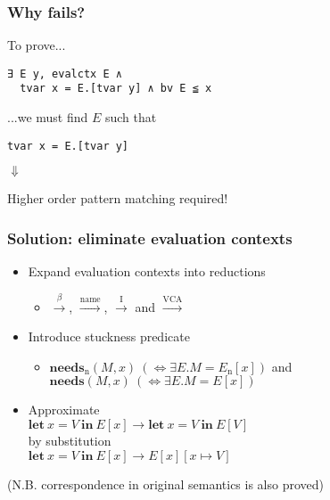 \documentclass[dvipdfmx,cjk,xcolor=dvipsnames,envcountsect,notheorems,12pt]{beamer}
\theoremstyle{definition}
\newcommand{\LET}[3]{\mathbf{let}~#1=#2~\mathbf{in}~#3}
\newcommand{\FULLBETA}{\xrightarrow{\beta}}
\newcommand{\CALLBYNEEDI}{\xrightarrow{\mathrm{I}}}
\newcommand{\CALLBYNEEDVCA}{\xrightarrow{\mathrm{VCA}}}
\newcommand{\CALLBYNAME}{\xrightarrow{\mathrm{name}}}
\newcommand{\DEMAND}[2]{\mathbf{needs}(#2, #1)}
\newcommand{\STUCK}[2]{\mathbf{needs}_\mathrm{n}(#2, #1)}
\begin{document}
\begin{frame}[fragile]
	\frametitle{Why fails?}
\Large
To prove...
\begin{lstlisting}
∃ E y, evalctx E ∧
  tvar x = E.[tvar y] ∧ bv E ≦ x
\end{lstlisting}
...we must find $E$ such that
\begin{lstlisting}
tvar x = E.[tvar y]
\end{lstlisting}
	\vfill
	\begin{center}{\fontsize{30pt}{25pt}\selectfont $\Downarrow$}\end{center} %
	\vfill
	\begin{center}
		Higher order pattern matching required!
	\end{center}
	\vfill
\end{frame}

\begin{frame}
	\frametitle{Solution: eliminate evaluation contexts}
	\vspace{-5mm}
	\begin{itemize}
		\item Expand evaluation contexts into reductions
			\begin{itemize}
				\item $\FULLBETA$, $\CALLBYNAME$, $\CALLBYNEEDI$ and $\CALLBYNEEDVCA$
			\end{itemize}
		\item Introduce stuckness predicate
			\begin{itemize}
				\item $\STUCK{x}{M}~(\Leftrightarrow \exists E. M=E_\mathrm{n}[x])$ and $\DEMAND{x}{M}~(\Leftrightarrow \exists E. M=E[x])$
			\end{itemize}
		\item Approximate\\
			${\LET{x}{V}{E[x]}}\rightarrow{\LET{x}{V}{E[V]}}$\\
			by substitution\\
			${\LET{x}{V}{E[x]}}\rightarrow{E[x][x\mapsto V]}$\\
	\end{itemize}
	\begin{flushright}
		(N.B. correspondence in original semantics is also proved)
	\end{flushright}
\end{frame}
\end{document}
